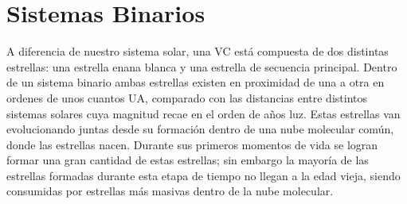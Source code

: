 \section{Sistemas Binarios}

A diferencia de nuestro sistema solar, una VC está compuesta de dos distintas
estrellas: una estrella enana blanca y una estrella de secuencia principal.
Dentro de un sistema binario ambas estrellas existen en proximidad de una a otra
en ordenes de unos cuantos UA, comparado con las distancias entre distintos
sistemas solares cuya magnitud recae en el orden de años luz. Estas estrellas
van evolucionando juntas desde su formación dentro de una nube molecular común,
donde las estrellas nacen. Durante sus primeros momentos de vida se logran
formar una gran cantidad de estas estrellas; sin embargo la mayoría de las
estrellas formadas durante esta etapa de tiempo no llegan a la edad vieja,
siendo consumidas por estrellas más masivas dentro de la nube molecular. 